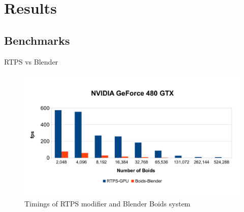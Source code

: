 \documentclass[red]{beamer}
\begin{document}
\section{Results}

\subsection{Benchmarks}

\begin{frame}{RTPS vs Blender}
	\begin{figure}[htbp]
	\begin{center}
	\includegraphics[scale=0.30]{../figures/benchmarks.pdf}
	\caption{Timings of RTPS modifier and Blender Boids system}
	\label{plot}
	\end{center}
	\end{figure}
\end{frame}

\end{document}
